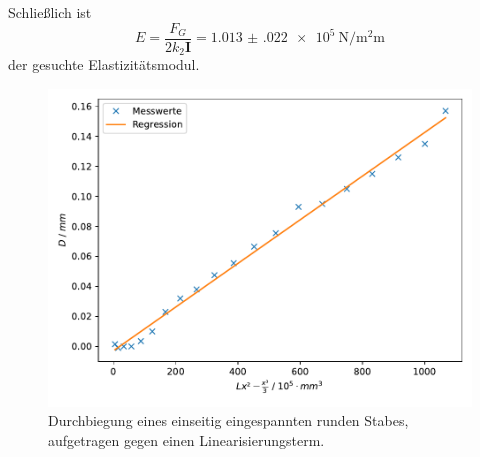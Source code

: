 Schließlich ist
\begin{equation*}
  E
  = \frac{F_G}{2 k_2 \mathbf{I}}
  = \SI[{scientific-notation = true, separate-uncertainty = true}]{1.013(022)e5}{\newton\per\square\milli\meter}
\end{equation*}
der gesuchte Elastizitätsmodul.


\begin{figure}
  \centering
  \includegraphics[scale=0.8]{build/plot_einseitig_rund.pdf}
  \caption{Durchbiegung eines einseitig eingespannten runden Stabes, aufgetragen gegen einen Linearisierungsterm.}
  \label{fig:regression2}
\end{figure}
